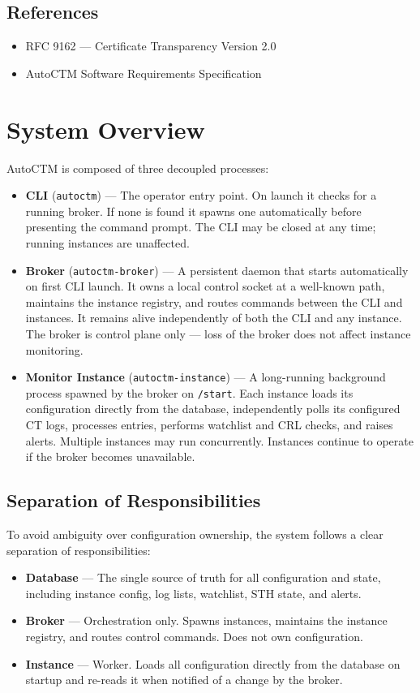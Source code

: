 \documentclass{article}
\begin{document}
\subsection{References}
\begin{itemize}
    \item RFC 9162 --- Certificate Transparency Version 2.0
    \item AutoCTM Software Requirements Specification
\end{itemize}

\section{System Overview}

AutoCTM is composed of three decoupled processes:

\begin{itemize}
    \item \textbf{CLI} (\texttt{autoctm}) --- The operator entry point. On
    launch it checks for a running broker. If none is found it spawns one
    automatically before presenting the command prompt. The CLI may be closed
    at any time; running instances are unaffected.
    \item \textbf{Broker} (\texttt{autoctm-broker}) --- A persistent daemon
    that starts automatically on first CLI launch. It owns a local control
    socket at a well-known path, maintains the instance registry, and routes
    commands between the CLI and instances. It remains alive independently of
    both the CLI and any instance. The broker is control plane only --- loss
    of the broker does not affect instance monitoring.
    \item \textbf{Monitor Instance} (\texttt{autoctm-instance}) --- A
    long-running background process spawned by the broker on \texttt{/start}.
    Each instance loads its configuration directly from the database,
    independently polls its configured CT logs, processes entries, performs
    watchlist and CRL checks, and raises alerts. Multiple instances may run
    concurrently. Instances continue to operate if the broker becomes
    unavailable.
\end{itemize}

\subsection{Separation of Responsibilities}
To avoid ambiguity over configuration ownership, the system follows a clear
separation of responsibilities:
\begin{itemize}
    \item \textbf{Database} --- The single source of truth for all
    configuration and state, including instance config, log lists, watchlist,
    STH state, and alerts.
    \item \textbf{Broker} --- Orchestration only. Spawns instances, maintains
    the instance registry, and routes control commands. Does not own
    configuration.
    \item \textbf{Instance} --- Worker. Loads all configuration directly from
    the database on startup and re-reads it when notified of a change by the
    broker.
\end{itemize}
\end{document}
